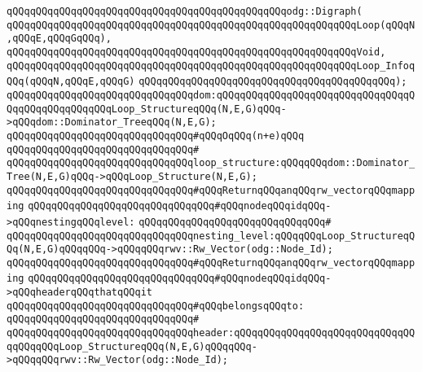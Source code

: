 \verb|qQQqqQQqqQQqqQQqqQQqqQQqqQQqqQQqqQQqqQQqqQQqqQQqodg::Digraph(|\newline
\newline
\verb|qQQqqQQqqQQqqQQqqQQqqQQqqQQqqQQqqQQqqQQqqQQqqQQqqQQqqQQqqQQqLoop(qQQqN,qQQqE,qQQqGqQQq),|\newline
\verb|qQQqqQQqqQQqqQQqqQQqqQQqqQQqqQQqqQQqqQQqqQQqqQQqqQQqqQQqqQQqVoid,|\newline
\verb|qQQqqQQqqQQqqQQqqQQqqQQqqQQqqQQqqQQqqQQqqQQqqQQqqQQqqQQqqQQqLoop_InfoqQQq(qQQqN,qQQqE,qQQqG)|\newline
\verb|qQQqqQQqqQQqqQQqqQQqqQQqqQQqqQQqqQQqqQQqqQQq);|\newline
\newline
\verb|qQQqqQQqqQQqqQQqqQQqqQQqqQQqqQQqdom:qQQqqQQqqQQqqQQqqQQqqQQqqQQqqQQqqQQqqQQqqQQqqQQqqQQqLoop_StructureqQQq(N,E,G)qQQq->qQQqdom::Dominator_TreeqQQq(N,E,G);|\newline
\newline
\verb|qQQqqQQqqQQqqQQqqQQqqQQqqQQqqQQq#qQQqOqQQq(n+e)qQQq|\newline
\verb|qQQqqQQqqQQqqQQqqQQqqQQqqQQqqQQq#|\newline
\verb|qQQqqQQqqQQqqQQqqQQqqQQqqQQqqQQqloop_structure:qQQqqQQqdom::Dominator_Tree(N,E,G)qQQq->qQQqLoop_Structure(N,E,G);|\newline
\newline
\verb|qQQqqQQqqQQqqQQqqQQqqQQqqQQqqQQq#qQQqReturnqQQqanqQQqrw_vectorqQQqmapping|\newline
\verb|qQQqqQQqqQQqqQQqqQQqqQQqqQQqqQQq#qQQqnodeqQQqidqQQq->qQQqnestingqQQqlevel:|\newline
\verb|qQQqqQQqqQQqqQQqqQQqqQQqqQQqqQQq#|\newline
\verb|qQQqqQQqqQQqqQQqqQQqqQQqqQQqqQQqnesting_level:qQQqqQQqLoop_StructureqQQq(N,E,G)qQQqqQQq->qQQqqQQqrwv::Rw_Vector(odg::Node_Id);|\newline
\newline
\verb|qQQqqQQqqQQqqQQqqQQqqQQqqQQqqQQq#qQQqReturnqQQqanqQQqrw_vectorqQQqmapping|\newline
\verb|qQQqqQQqqQQqqQQqqQQqqQQqqQQqqQQq#qQQqnodeqQQqidqQQq->qQQqheaderqQQqthatqQQqit|\newline
\verb|qQQqqQQqqQQqqQQqqQQqqQQqqQQqqQQq#qQQqbelongsqQQqto:|\newline
\verb|qQQqqQQqqQQqqQQqqQQqqQQqqQQqqQQq#|\newline
\verb|qQQqqQQqqQQqqQQqqQQqqQQqqQQqqQQqheader:qQQqqQQqqQQqqQQqqQQqqQQqqQQqqQQqqQQqqQQqLoop_StructureqQQq(N,E,G)qQQqqQQq->qQQqqQQqrwv::Rw_Vector(odg::Node_Id);|\newline
